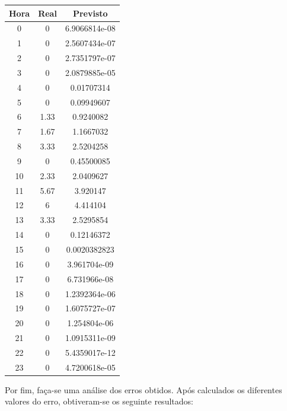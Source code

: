 \documentclass[a4paper, 12pt]{article}
\begin{document}
\begin{table}[H]
	\centering
	\begin{tabular}{||c||c|c||}
		\hline\hline
		Hora & Real&Previsto\\
		\hline\hline
		0 & 
0
 & 6.9066814e-08 \\
		\hline
		1  &
0 & 2.5607434e-07\\
		\hline
		2 & 0 & 2.7351797e-07\\
		\hline
		3  & 0

 &2.0879885e-05 \\
		\hline
		4 & 0
 &0.01707314 \\
		\hline
		5  &0 
 &0.09949607 \\
		\hline
		6 & 1.33

 & 

0.9240082 \\
		\hline
		7 & 1.67

 & 1.1667032\\
		\hline
		8  &3.33
 & 2.5204258\\
		\hline
		9 & 0 &  0.45500085\\
		\hline
		10 & 
2.33
 &  2.0409627 \\
		\hline
		11  &
5.67 &3.920147 \\
		\hline
		12 & 6 &  4.414104\\
		\hline
		13  & 
3.33
 & 2.5295854 \\
		\hline
		14 & 
0  & 0.12146372\\
		\hline
		15  & 0
 &0.0020382823 \\
		\hline
		16 & 0
 & 
3.961704e-09 \\
		\hline
		17 & 
0
 & 6.731966e-08 \\
		\hline
		18  &
0 &1.2392364e-06 \\
		\hline
		19 &0  & 1.6075727e-07	\\
		\hline
		20 & 

0 & 1.254804e-06\\
		\hline
		21  &
0 & 1.0915311e-09\\
		\hline
		22 & 0 & 5.4359017e-12	\\
		\hline
		23  & 0

 & 4.7200618e-05 \\
		\hline\hline
	\end{tabular}
\end{table} 


Por fim, faça-se uma análise dos erros obtidos. Após calculados os diferentes valores do erro, obtiveram-se os seguinte resultados:
\end{document}
